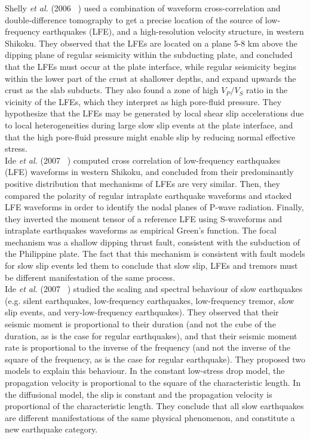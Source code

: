 \documentclass[main.tex]{subfiles}
\begin{document}
Shelly \textit{et al.} (2006 ~\cite{SHE_2006}) used a combination of waveform cross-correlation and double-difference tomography to get a precise location of the source of low-frequency earthquakes (LFE), and a high-resolution velocity structure, in western Shikoku. They observed that the LFEs are located on a plane 5-8 km above the dipping plane of regular seismicity within the subducting plate, and concluded that the LFEs must occur at the plate interface, while regular seismicity begins within the lower part of the crust at shallower depths, and expand upwards the crust as the slab subducts. They also found a zone of high $V_P / V_S$ ratio in the vicinity of the LFEs, which they interpret as high pore-fluid pressure. They hypothesize that the LFEs may be generated by local shear slip accelerations due to local heterogeneities during large slow slip events at the plate interface, and that the high pore-fluid pressure might enable slip by reducing normal effective stress. \\

Ide \textit{et al.} (2007 ~\cite{IDE_2007_GRL}) computed cross correlation of low-frequency earthquakes (LFE) waveforms in western Shikoku, and concluded from their predominantly positive distribution that mechanisms of LFEs are very similar. Then, they compared the polarity of regular intraplate earthquake waveforms and stacked LFE waveforms in order to identify the nodal planes of P-wave radiation. Finally, they inverted the moment tensor of a reference LFE using S-waveforms and intraplate earthquakes waveforms as empirical Green's function. The focal mechanism was a shallow dipping thrust fault, consistent with the subduction of the Philippine plate. The fact that this mechanism is consistent with fault models for slow slip events led them to conclude that slow slip, LFEs and tremors must be different manifestation of the same process. \\

Ide \textit{et al.} (2007 ~\cite{IDE_2007_nature}) studied the scaling and spectral behaviour of slow earthquakes (e.g. silent earthquakes, low-frequency earthquakes, low-frequency tremor, slow slip events, and very-low-frequency earthquakes). They observed that their seismic moment is proportional to their duration (and not the cube of the duration, as is the case for regular earthquakes), and that their seismic moment rate is proportional to the inverse of the frequency (and not the inverse of the square of the frequency, as is the case for regular earthquake). They proposed two models to explain this behaviour. In the constant low-stress drop model, the propagation velocity is proportional to the square of the characteristic length. In the diffusional model, the slip is constant and the propagation velocity is proportional of the characteristic length. They conclude that all slow earthquakes are different manifestations of the same physical phenomenon, and constitute a new earthquake category. \\
\end{document}
